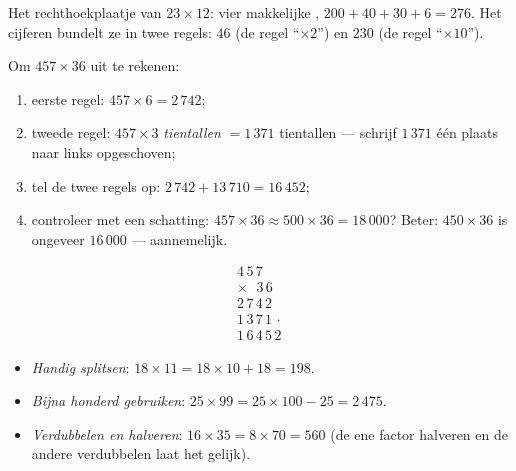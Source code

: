\begin{omfigure}

{\small Het rechthoekplaatje van $23 \times 12$: vier makkelijke
, $200 + 40 + 30 + 6 = 276$. Het cijferen bundelt ze in twee
regels: $46$ (de regel ``$\times 2$'') en $230$ (de regel
``$\times 10$'').}
\end{omfigure}

\begin{method}\label{met:g4:mult:column}
Om $457 \times 36$ uit te rekenen:
\begin{enumerate}
  \item eerste regel: $457 \times 6 = 2\,742$;
  \item tweede regel: $457 \times 3$ \emph{tientallen} $= 1\,371$
        tientallen --- schrijf $1\,371$ één plaats naar links
        opgeschoven;
  \item tel de twee regels op: $2\,742 + 13\,710 = 16\,452$;
  \item controleer met een schatting: $457 \times 36 \approx 500 \times
        36 = 18\,000$? Beter: $450 \times 36$ is ongeveer $16\,000$ ---
        aannemelijk.
\end{enumerate}
\[
\begin{array}{r}
4\,5\,7 \\
\times\ \ \,3\,6 \\
\hline
2\,7\,4\,2 \\
1\,3\,7\,1\,\cdot \\
\hline
1\,6\,4\,5\,2
\end{array}
\]
\end{method}

\begin{example}\label{ex:g4:mult:tricks}
\begin{itemize}
  \item \emph{Handig splitsen}: $18 \times 11 = 18 \times 10 + 18 = 198$.
  \item \emph{Bijna honderd gebruiken}: $25 \times 99 = 25 \times 100 -
        25 = 2\,475$.
  \item \emph{Verdubbelen en halveren}: $16 \times 35 = 8 \times 70 =
        560$ (de ene factor halveren en de andere verdubbelen laat het
         gelijk).
\end{itemize}
\end{example}

